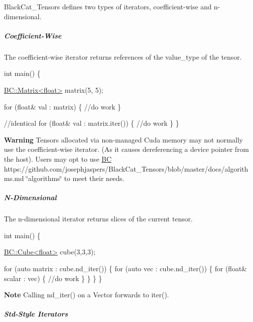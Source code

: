 Black\+Cat\+\_\+\+Tensors defines two types of iterators, coefficient-\/wise and n-\/dimensional. 



\subparagraph*{Coefficient-\/\+Wise}

The coefficient-\/wise iterator returns references of the {\ttfamily value\+\_\+type} of the tensor.


\begin{DoxyCode}
\textcolor{keywordtype}{int} main() \{

    \hyperlink{classBC_1_1tensors_1_1Tensor__Base}{BC::Matrix<float>} matrix(5, 5); 

    \textcolor{keywordflow}{for} (\textcolor{keywordtype}{float}& val : matrix) \{
      \textcolor{comment}{//do work }
    \}

    \textcolor{comment}{//identical}
    \textcolor{keywordflow}{for} (\textcolor{keywordtype}{float}& val : matrix.iter()) \{
      \textcolor{comment}{//do work }
    \}
\}
\end{DoxyCode}
 {\bfseries Warning} Tensor\textquotesingle{}s allocated via non-\/managed Cuda memory may not normally use the coefficient-\/wise iterator. (As it causes dereferencing a device pointer from the host). User\textquotesingle{}s may opt to use {\ttfamily \hyperlink{namespaceBC}{BC}} https\+://github.com/josephjaspers/\+Black\+Cat\+\_\+\+Tensors/blob/master/docs/algorithms.\+md \char`\"{}algorithms\char`\"{} to meet their needs. 



\subparagraph*{N-\/\+Dimensional}

The n-\/dimensional iterator returns slices of the current tensor.


\begin{DoxyCode}
\textcolor{keywordtype}{int} main() \{ 

  \hyperlink{classBC_1_1tensors_1_1Tensor__Base}{BC::Cube<float>} cube(3,3,3); 

  \textcolor{keywordflow}{for} (\textcolor{keyword}{auto} matrix : cube.nd\_iter()) \{       
    \textcolor{keywordflow}{for} (\textcolor{keyword}{auto} vec : cube.nd\_iter()) \{        
      \textcolor{keywordflow}{for} (\textcolor{keywordtype}{float}& scalar : vec) \{
         \textcolor{comment}{//do work }
      \}
    \}
  \}
\}
\end{DoxyCode}


{\bfseries Note} Calling {\ttfamily nd\+\_\+iter()} on a Vector forwards to {\ttfamily iter()}. 

 \subparagraph*{Std-\/\+Style Iterators}


